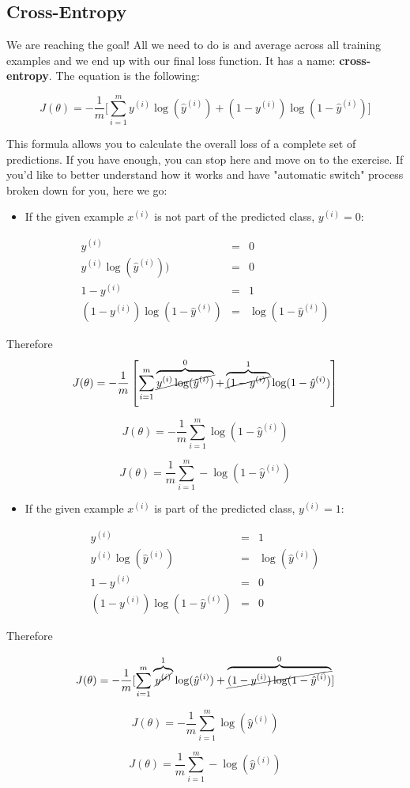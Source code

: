 \subsection*{Cross-Entropy}
We are reaching the goal!
All we need to do is and average across all training examples and we end up with our final loss function.
It has a name: \textbf{cross-entropy}. The equation is the following:  

$$
J( \theta) = -\frac{1} {m} \lbrack \sum_{i = 1}^{m} y^{(i)}\log(\hat{y}^{(i)}) + (1 - y^{(i)})\log(1 - \hat{y}^{(i)})\rbrack
$$

This formula allows you to calculate the overall loss of a complete set of predictions.
If you have enough, you can stop here and move on to the exercise.
If you'd like to better understand how it works and have "automatic switch" process broken down for you, here we go:

\begin{itemize}
    \item If the given example $x^{(i)}$ is not part of the predicted class, $y^{(i)} = 0$:
\end{itemize}
$$
\begin{matrix}
y^{(i)} & = & 0 \\
y^{(i)}\log(\hat{y}^{(i)})) & = & 0 \\
1 - y^{(i)} & = & 1 \\
(1 - y^{(i)})\log(1 - \hat{y}^{(i)}) & = & \log(1 - \hat{y}^{(i)})
\end{matrix}
$$

Therefore
$$
J(\theta) = -\frac{1}{m} \left[ \sum_{i = 1}^{m} \overbrace{\cancel{y^{(i)}\log(\hat{y}^{(i)})}}^{0} + \overbrace{\cancel{(1 - y^{(i)})}}^{1}\log(1 - \hat{y}^{(i)})\right]
$$

$$
J(\theta) = -\frac{1}{m} \sum_{i = 1}^{m} \log(1 - \hat{y}^{(i)})
$$

$$
J(\theta) = \frac{1}{m} \sum_{i = 1}^{m} -\log(1 - \hat{y}^{(i)})
$$

\begin{itemize}
    \item If the given example $x^{(i)}$ is part of the predicted class, $y^{(i)} = 1$:
\end{itemize}

$$
\begin{matrix}
y^{(i)} & = & 1 \\
y^{(i)}\log(\hat{y}^{(i)}) & = & \log(\hat{y}^{(i)})\\
1 - y^{(i)} & = & 0 \\ 
(1 - y^{(i)})\log(1 - \hat{y}^{(i)}) & = & 0  
\end{matrix}
$$

Therefore

$$
J( \theta) = -\frac{1}{m} \lbrack \sum_{i = 1}^{m} \overbrace{\cancel{y^{(i)}}}^{1}\log(\hat{y}^{(i)}) + \overbrace{\cancel{(1 - y^{(i)})\log(1 - \hat{y}^{(i)})}}^{0}\rbrack
$$

$$
J( \theta) = -\frac{1}{m} \sum_{i = 1}^{m} \log(\hat{y}^{(i)})
$$

$$
J( \theta) = \frac{1}{m} \sum_{i = 1}^{m} -\log(\hat{y}^{(i)})
$$
